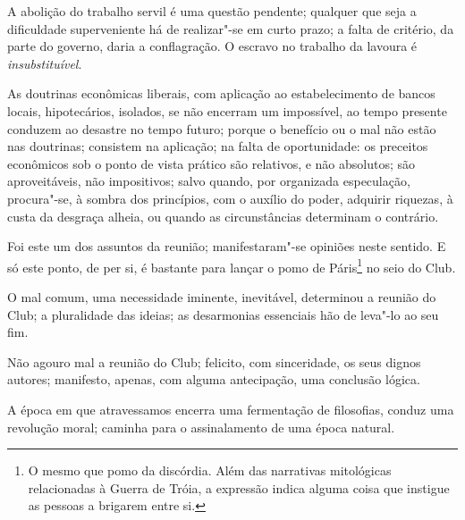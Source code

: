 A abolição do trabalho servil é uma questão pendente; qualquer que seja
a dificuldade superveniente há de realizar"-se em curto prazo; a falta de
critério, da parte do governo, daria a conflagração. O escravo no
trabalho da lavoura é \emph{insubstituível}.

As doutrinas econômicas liberais, com aplicação ao estabelecimento de
bancos locais, hipotecários, isolados, se não encerram um impossível, ao
tempo presente conduzem ao desastre no tempo futuro; porque o benefício
ou o mal não estão nas doutrinas; consistem na aplicação; na falta de
oportunidade: os preceitos econômicos sob o ponto de vista prático são
relativos, e não absolutos; são aproveitáveis, não impositivos; salvo
quando, por organizada especulação, procura"-se, à sombra dos princípios,
com o auxílio do poder, adquirir riquezas, à custa da desgraça alheia,
ou quando as circunstâncias determinam o contrário.

Foi este um dos assuntos da reunião; manifestaram"-se opiniões neste
sentido. E só este ponto, de per si, é bastante para lançar o pomo de
Páris\footnote{O mesmo que pomo da discórdia. Além das narrativas
  mitológicas relacionadas à Guerra de Tróia, a expressão indica alguma
  coisa que instigue as pessoas a brigarem entre si.} no seio do Club.

O mal comum, uma necessidade iminente, inevitável, determinou a reunião
do Club; a pluralidade das ideias; as desarmonias essenciais hão de
leva"-lo ao seu fim.

Não agouro mal a reunião do Club; felicito, com sinceridade, os seus
dignos autores; manifesto, apenas, com alguma antecipação, uma conclusão
lógica.

A época em que atravessamos encerra uma fermentação de filosofias,
conduz uma revolução moral; caminha para o assinalamento de uma época
natural.

\asterisc



